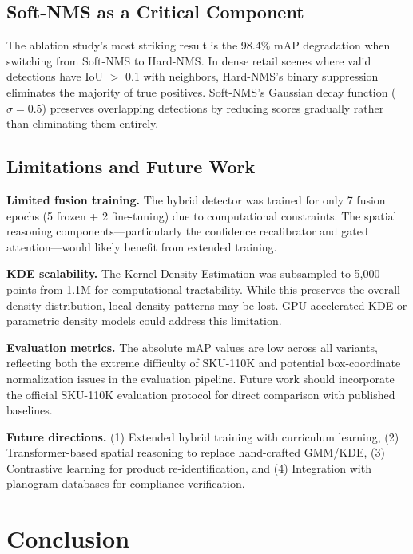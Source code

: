 \documentclass[conference]{IEEEtran}
\begin{document}
\subsection{Soft-NMS as a Critical Component}

The ablation study's most striking result is the 98.4\% mAP degradation when
switching from Soft-NMS to Hard-NMS. In dense retail scenes where valid
detections have IoU $>$ 0.1 with neighbors, Hard-NMS's binary suppression
eliminates the majority of true positives. Soft-NMS's Gaussian decay function
($\sigma = 0.5$) preserves overlapping detections by reducing scores gradually
rather than eliminating them entirely.

\subsection{Limitations and Future Work}

\textbf{Limited fusion training.} The hybrid detector was trained for only
7 fusion epochs (5 frozen + 2 fine-tuning) due to computational constraints.
The spatial reasoning components---particularly the confidence recalibrator
and gated attention---would likely benefit from extended training.

\textbf{KDE scalability.} The Kernel Density Estimation was subsampled to
5,000 points from 1.1M for computational tractability. While this preserves
the overall density distribution, local density patterns may be lost.
GPU-accelerated KDE or parametric density models could address this limitation.

\textbf{Evaluation metrics.} The absolute mAP values are low across all
variants, reflecting both the extreme difficulty of SKU-110K and potential
box-coordinate normalization issues in the evaluation pipeline. Future work
should incorporate the official SKU-110K evaluation protocol for direct
comparison with published baselines.

\textbf{Future directions.} (1) Extended hybrid training with curriculum
learning, (2) Transformer-based spatial reasoning to replace hand-crafted
GMM/KDE, (3) Contrastive learning for product re-identification, and
(4) Integration with planogram databases for compliance verification.

\section{Conclusion}
\label{sec:conclusion}
\end{document}
